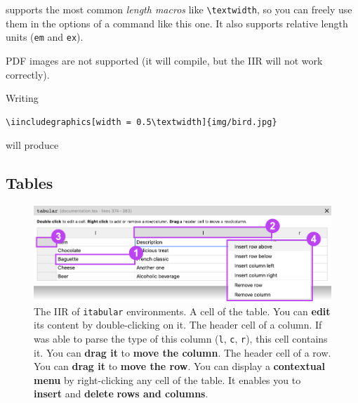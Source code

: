 
\begin{info}
    \iLaTeX{} supports the most common \emph{length macros} like \verb|\textwidth|, so you can freely use them in the options of a command like this one.
    It also supports relative length units (\texttt{em} and \texttt{ex}).
\end{info}

\begin{warning}
    PDF images are not supported (it will compile, but the IIR will not work correctly).
\end{warning}

\begin{example}
    Writing

    \begin{lstlisting}[style=custom-latex-example]
\iincludegraphics[width = 0.5\textwidth]{img/bird.jpg}
    \end{lstlisting}
    
    will produce

    \centering
\end{example}




\newpage
\subsection{Tables}

\begin{figure}[hb!]
    \centering
    \includegraphics[width = \textwidth]{img/iir-itabular.png}
    \caption{The IIR of \texttt{itabular} environments.  A cell of the table. You can \textbf{edit} its content by double-clicking on it.  The header cell of a column. If \iLaTeX{} was able to parse the type of this column (\eg \texttt{l}, \texttt{c}, \texttt{r}), this cell contains it. You can \textbf{drag it} to \textbf{move the column}.  The header cell of a row. You can \textbf{drag it} to \textbf{move the row}.  You can display a \textbf{contextual menu} by right-clicking any cell of the table. It enables you to \textbf{insert} and \textbf{delete} \textbf{rows and columns}.}
    \label{fig:iir-itabular}
\end{figure}

